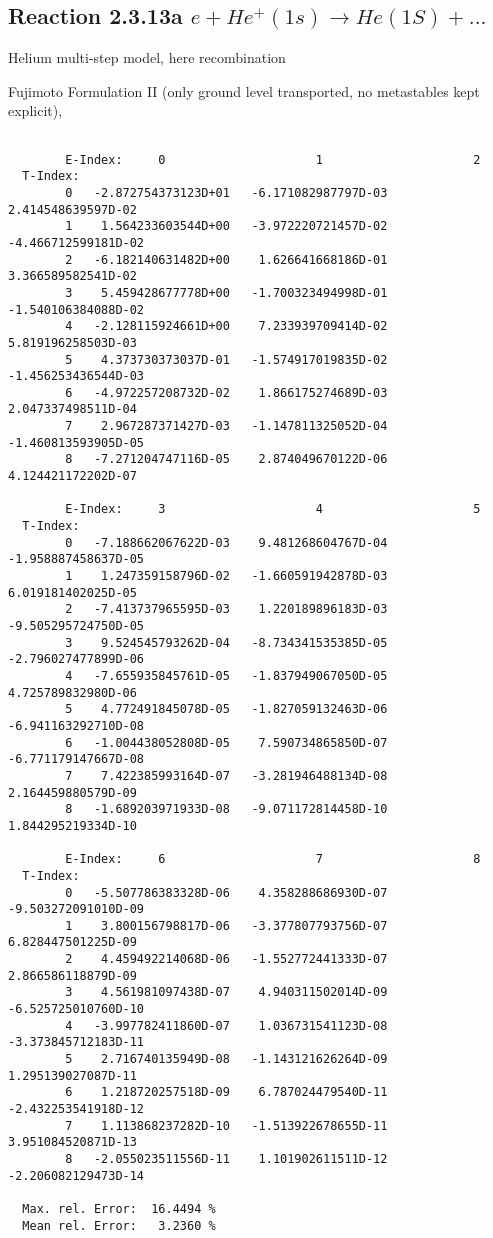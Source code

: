\documentclass[12pt]{article}
\begin{document}
\subsection{
Reaction 2.3.13a  $e + He^+(1s) \rightarrow He(1S) + ...  $
}

Helium multi-step model, here recombination

 Fujimoto Formulation II (only ground level transported, no metastables kept
explicit), \cite{kn:Fujimoto}


\begin{small}\begin{verbatim}

        E-Index:     0                     1                     2
  T-Index:
        0   -2.872754373123D+01   -6.171082987797D-03    2.414548639597D-02
        1    1.564233603544D+00   -3.972220721457D-02   -4.466712599181D-02
        2   -6.182140631482D+00    1.626641668186D-01    3.366589582541D-02
        3    5.459428677778D+00   -1.700323494998D-01   -1.540106384088D-02
        4   -2.128115924661D+00    7.233939709414D-02    5.819196258503D-03
        5    4.373730373037D-01   -1.574917019835D-02   -1.456253436544D-03
        6   -4.972257208732D-02    1.866175274689D-03    2.047337498511D-04
        7    2.967287371427D-03   -1.147811325052D-04   -1.460813593905D-05
        8   -7.271204747116D-05    2.874049670122D-06    4.124421172202D-07

        E-Index:     3                     4                     5
  T-Index:
        0   -7.188662067622D-03    9.481268604767D-04   -1.958887458637D-05
        1    1.247359158796D-02   -1.660591942878D-03    6.019181402025D-05
        2   -7.413737965595D-03    1.220189896183D-03   -9.505295724750D-05
        3    9.524545793262D-04   -8.734341535385D-05   -2.796027477899D-06
        4   -7.655935845761D-05   -1.837949067050D-05    4.725789832980D-06
        5    4.772491845078D-05   -1.827059132463D-06   -6.941163292710D-08
        6   -1.004438052808D-05    7.590734865850D-07   -6.771179147667D-08
        7    7.422385993164D-07   -3.281946488134D-08    2.164459880579D-09
        8   -1.689203971933D-08   -9.071172814458D-10    1.844295219334D-10

        E-Index:     6                     7                     8
  T-Index:
        0   -5.507786383328D-06    4.358288686930D-07   -9.503272091010D-09
        1    3.800156798817D-06   -3.377807793756D-07    6.828447501225D-09
        2    4.459492214068D-06   -1.552772441333D-07    2.866586118879D-09
        3    4.561981097438D-07    4.940311502014D-09   -6.525725010760D-10
        4   -3.997782411860D-07    1.036731541123D-08   -3.373845712183D-11
        5    2.716740135949D-08   -1.143121626264D-09    1.295139027087D-11
        6    1.218720257518D-09    6.787024479540D-11   -2.432253541918D-12
        7    1.113868237282D-10   -1.513922678655D-11    3.951084520871D-13
        8   -2.055023511556D-11    1.101902611511D-12   -2.206082129473D-14

  Max. rel. Error:  16.4494 %
  Mean rel. Error:   3.2360 %
\end{verbatim}\end{small}
\end{document}
